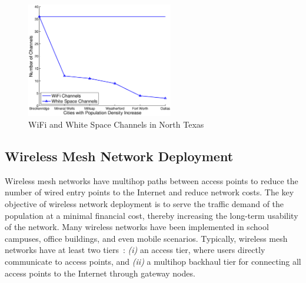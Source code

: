 \begin{figure}
\vspace{-0.0in}
\centering
\includegraphics[width=64mm]{figures/wschannels}
\vspace{-0.1in}
\caption{WiFi and White Space Channels in North Texas}
\label{fig:wschannels}
\vspace{-0.3in}
\end{figure}


\subsection{Wireless Mesh Network Deployment} 
Wireless mesh networks have multihop paths between access points to reduce the number of wired entry points 
to the Internet and reduce network costs. 
The key objective of wireless network deployment is 
to serve the traffic demand of the population at a minimal financial cost, thereby increasing the long-term 
usability of the network. 
Many wireless networks have been implemented 
in school campuses, office buildings, and even mobile scenarios. Typically, wireless mesh networks 
have at least two tiers~\cite{CRSK06}: {\it (i)} an access tier, where users directly communicate to 
access points, and {\it (ii)} a multihop backhaul tier for connecting all access points to the 
Internet through gateway nodes. 


